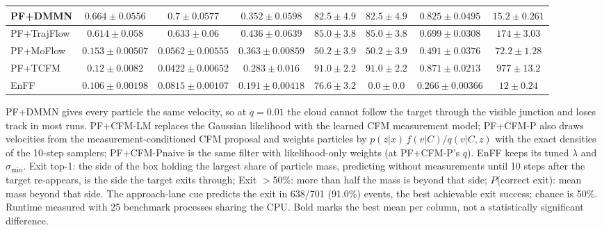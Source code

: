 \begin{table}[ht]
\begin{adjustbox}{max width=\linewidth}
\begin{tabular}{lccccccc}
PF+DMMN & $0.664\pm0.0556$ & $0.7\pm0.0577$ & $0.352\pm0.0598$ & $82.5\pm4.9$ & $82.5\pm4.9$ & $0.825\pm0.0495$ & $15.2\pm0.261$ \\
\midrule
PF+TrajFlow & $0.614\pm0.058$ & $0.633\pm0.06$ & $0.436\pm0.0639$ & $85.0\pm3.8$ & $85.0\pm3.8$ & $0.699\pm0.0308$ & $174\pm3.03$ \\
PF+MoFlow & $0.153\pm0.00507$ & $0.0562\pm0.00555$ & $0.363\pm0.00859$ & $50.2\pm3.9$ & $50.2\pm3.9$ & $0.491\pm0.0376$ & $72.2\pm1.28$ \\
PF+TCFM & $0.12\pm0.0082$ & $0.0422\pm0.00652$ & $0.283\pm0.016$ & $\mathbf{91.0\pm2.2}$ & $\mathbf{91.0\pm2.2}$ & $\mathbf{0.871\pm0.0213}$ & $977\pm13.2$ \\
EnFF & $0.106\pm0.00198$ & $0.0815\pm0.00107$ & $0.191\pm0.00418$ & $76.6\pm3.2$ & $0.0\pm0.0$ & $0.266\pm0.00366$ & $12\pm0.24$ \\
\bottomrule
\end{tabular}
\end{adjustbox}
\par\smallskip\parbox{0.95\linewidth}{\footnotesize PF+DMMN gives every particle the same velocity, so at $q{=}0.01$ the cloud cannot follow the target through the visible junction and loses track in most runs. PF+CFM-LM replaces the Gaussian likelihood with the learned CFM measurement model; PF+CFM-P also draws velocities from the measurement-conditioned CFM proposal and weights particles by $p(z|x)\,f(v|C)/q(v|C,z)$ with the exact densities of the 10-step samplers; PF+CFM-Pnaive is the same filter with likelihood-only weights (at PF+CFM-P's $q$). EnFF keeps its tuned $\lambda$ and $\sigma_{\min}$. Exit top-1: the side of the box holding the largest share of particle mass, predicting without measurements until 10 steps after the target re-appears, is the side the target exits through; Exit $>$50\%: more than half the mass is beyond that side; $P$(correct exit): mean mass beyond that side. The approach-lane cue predicts the exit in 638/701 (91.0\%) events, the best achievable exit success; chance is 50\%. Runtime measured with 25 benchmark processes sharing the CPU. Bold marks the best mean per column, not a statistically significant difference.}
\end{table}


